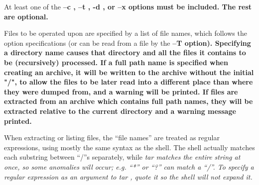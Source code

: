 \par\noindent
At least one of the %
\bf --c\rm%
, %
\bf --t\rm%
, %
\bf -d\rm%
, or %
\bf --x \rm%
 options
must be included.  The rest are optional.
\par\noindent
Files to be operated upon are specified by a list of file names, which
follows the option specifications (or can be read from a file by the
%
\bf --T \rm%
 option).  Specifying a directory name causes that directory
and all the files it contains to be (recursively) processed.  If a
full path name is specified when creating an archive, it will be written
to the archive without the initial "/", to allow the files to be later
read into a different place than where they were
dumped from, and a warning will be printed.  If
files are extracted from an archive which contains 
full path names, they will be extracted relative to the current directory
and a warning message printed.
\par\noindent
When extracting or listing files, the ``file names'' are treated as
regular expressions, using mostly the same syntax as the shell.  The
shell actually matches each substring between ``/''s separately, while
%
\it tar \rm%
 matches the entire string at once, so some anomalies will
occur; e.g. ``*'' or ``?'' can match a ``/''.  To specify a regular
expression as an argument to %
\it tar\rm%
, quote it so the shell will not
expand it.
